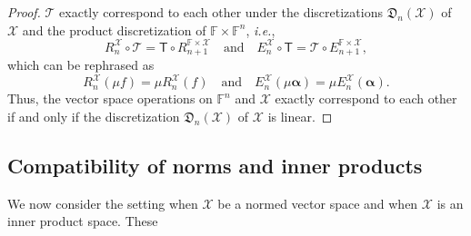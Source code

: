 \documentclass[a4paper]{paper}
\newcommand{\Discr}{\mathfrak{D}}
\newcommand{\VecSpace}[1]{\mathscr{#1}}
\newcommand{\Field}{\mathbb{F}}
\newcommand{\Op}[1]{\mathcal{#1}}
\newcommand{\DiscOp}[1]{\mathsf{#1}}
\newcommand*{\EXT}[2]{\ensuremath{E_{#1}^{#2}}}
\newcommand*{\REST}[2]{\ensuremath{R_{#1}^{#2}}}
\newcommand*{\RnX}{\ensuremath{\REST{n}{\VecSpace{X}}}}
\newcommand*{\EnX}{\ensuremath{\EXT{n}{\VecSpace{X}}}}
\newcommand{\ie}{\textsl{i.e.}\xspace}
\newcommand{\valpha}{\boldsymbol{\alpha}}
\begin{document}
\begin{proof}
 $\Op{T}$ exactly correspond to each other under the discretizations $\Discr_{n}(\VecSpace{X})$ of $\VecSpace{X}$ 
 and the product discretization of  $\Field \times \Field^{n}$, \ie,
 \begin{equation*}
  \RnX \circ \Op{T} =  \DiscOp{T} \circ R_{n+1}^{\Field \times \VecSpace{X}}
  \quad\text{and}\quad 
  \EnX\circ \DiscOp{T} =  \Op{T} \circ E_{n+1}^{\Field \times \VecSpace{X}},
 \end{equation*}
 which can be rephrased as
 \begin{equation*}
  \RnX(\mu f) =  \mu \RnX(f) 
  \quad\text{and}\quad 
  \EnX(\mu \valpha) = \mu \EnX(\valpha).
 \end{equation*}
 Thus, the vector space operations on $\Field^{n}$ and $\VecSpace{X}$ exactly correspond to each other if and only if the discretization 
 $\Discr_{n}(\VecSpace{X})$ of $\VecSpace{X}$ is linear.
\end{proof}

\subsection{Compatibility of norms and inner products}

We now consider the setting when $\VecSpace{X}$ be a normed vector space and when $\VecSpace{X}$ is an inner product space. These 
\end{document}
